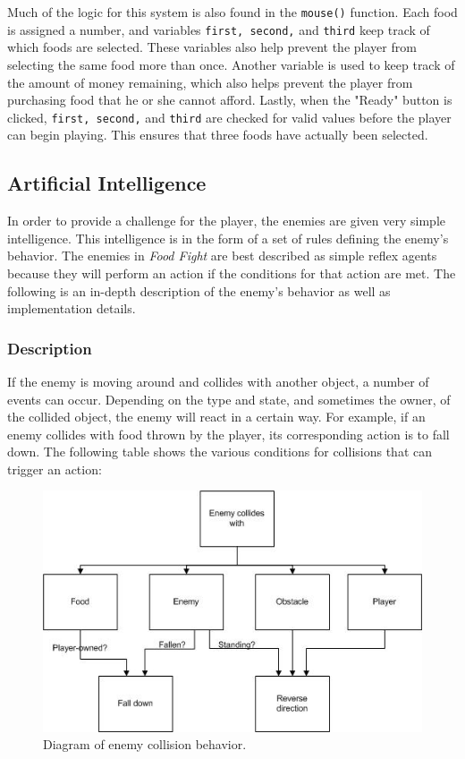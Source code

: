 \documentclass{article}
\begin{document}
Much of the logic for this system is also found in the \verb+mouse()+ function. Each food is assigned a number, and variables \verb+first, second,+ and \verb+third+ keep track of which foods are selected. These variables also help prevent the player from selecting the same food more than once. Another variable is used to keep track of the amount of money remaining, which also helps prevent the player from purchasing food that he or she cannot afford. Lastly, when the "Ready" button is clicked, \verb+first, second,+ and \verb+third+ are checked for valid values before the player can begin playing. This ensures that three foods have actually been selected.

\subsection{Artificial Intelligence}
In order to provide a challenge for the player, the enemies are given very simple intelligence. This intelligence is in the form of a set of rules defining the enemy's behavior. The enemies in \textit{Food Fight} are best described as simple reflex agents because they will perform an action if the conditions for that action are met. The following is an in-depth description of the enemy's behavior as well as implementation details.

\subsubsection{Description}
If the enemy is moving around and collides with another object, a number of events can occur. Depending on the type and state, and sometimes the owner, of the collided object, the enemy will react in a certain way. For example, if an enemy collides with food thrown by the player, its corresponding action is to fall down. The following table shows the various conditions for collisions that can trigger an action: \\

\begin{figure}[H]
    \centering
    \includegraphics{enemyAI}
    \caption{Diagram of enemy collision behavior.}
\end{figure}
\end{document}
